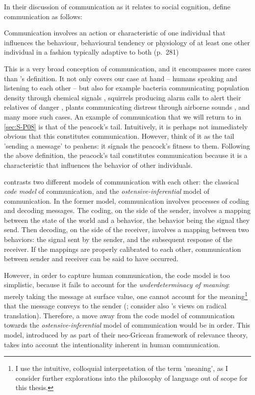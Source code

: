 In their discussion of communication as it relates to social cognition, \citet{Freeberg19} define communication as follows:
\begin{quoting}
    Communication involves an action or characteristic of one individual that influences the behaviour, behavioural tendency or physiology of at least one other individual in a fashion typically adaptive to both
    \hfill (p.~281)
\end{quoting}
This is a very broad conception of communication, and it encompasses more cases than \citeauthor{DawkinsKrebs78}'s definition. It not only covers our case at hand -- humans speaking and listening to each other -- but also for example bacteria communicating population density through chemical signals \citep{Federle03}, squirrels producing alarm calls to alert their relatives of danger \citep{Sherman77}, plants communicating distress through airborne sounds \citep{Khait23}, and many more such cases.
An example of communication that we will return to in \cref{sec:S-P08} is that of the peacock's tail. Intuitively, it is perhaps not immediately obvious that this constitutes communication. However, think of it as the tail 'sending a message' to peahens: it signals the peacock's fitness to them.
Following the above definition, the peacock's tail constitutes communication because it is a characteristic that influences the behavior of other individuals.

\citet{Scott-Phillips15-primate} contrasts two different models of communication with each other: the classical \emph{code model} of communication, and the \emph{ostensive-inferential} model of communication.
In the former model, communication involves processes of coding and decoding messages. The coding, on the side of the sender, involves a mapping between the state of the world and a behavior, the behavior being the signal they send. Then decoding, on the side of the receiver, involves a mapping between two behaviors: the signal sent by the sender, and the subsequent response of the receiver. If the mappings are properly calibrated to each other, communication between sender and receiver can be said to have occurred.

However, in order to capture human communication, the code model is too simplistic, because it fails to account for the \emph{underdeterminacy of meaning}: merely taking the message at surface value, one cannot account for the meaning\footnote{I use the intuitive, colloquial interpretation of the term 'meaning', as I consider further explorations into the philosophy of language out of scope for this thesis.} that the message conveys to the sender (\citet{Scott-Phillips18-communication}; consider also \citet{Quine60}'s views on radical translation).
Therefore, a move away from the code model of communication towards the \emph{ostensive-inferential} model of communication would be in order. This model, introduced by \citet{SperberWilson86} as part of their neo-Gricean framework of relevance theory, takes into account the intentionality inherent in human communication.

